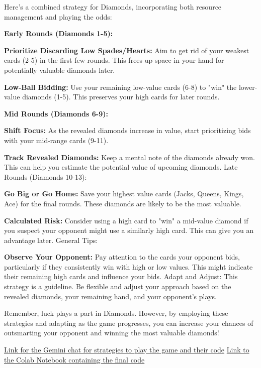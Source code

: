 \documentclass[runningheads]{llncs}
\begin{document}
\begin{thebibliography}{8}
Here's a combined strategy for Diamonds, incorporating both resource management and playing the odds:

\textbf{Early Rounds (Diamonds 1-5):}

\textbf{Prioritize Discarding Low Spades/Hearts:} Aim to get rid of your weakest cards (2-5) in the first few rounds. This frees up space in your hand for potentially valuable diamonds later.

\textbf{Low-Ball Bidding: }Use your remaining low-value cards (6-8) to "win" the lower-value diamonds (1-5). This preserves your high cards for later rounds.

\textbf{Mid Rounds (Diamonds 6-9):}

\textbf{Shift Focus: }As the revealed diamonds increase in value, start prioritizing bids with your mid-range cards (9-11).

\textbf{Track Revealed Diamonds:} Keep a mental note of the diamonds already won. This can help you estimate the potential value of upcoming diamonds.
Late Rounds (Diamonds 10-13):

\textbf{Go Big or Go Home: }Save your highest value cards (Jacks, Queens, Kings, Ace) for the final rounds. These diamonds are likely to be the most valuable.

\textbf{Calculated Risk: }Consider using a high card to "win" a mid-value diamond if you suspect your opponent might use a similarly high card. This can give you an advantage later.
General Tips:

\textbf{Observe Your Opponent:} Pay attention to the cards your opponent bids, particularly if they consistently win with high or low values. This might indicate their remaining high cards and influence your bids.
Adapt and Adjust: This strategy is a guideline. Be flexible and adjust your approach based on the revealed diamonds, your remaining hand, and your opponent's plays.

Remember, luck plays a part in Diamonds. However, by employing these strategies and adapting as the game progresses, you can increase your chances of outsmarting your opponent and winning the most valuable diamonds!

 \hyperlink{https://g.co/gemini/share/a8158544ac4e}{Link for the Gemini chat for strategies to play the game and their code}
\hyperlink{https://colab.research.google.com/drive/1p7STrJ8kBAuQ75E07eEHfYwvUyl0YKSX?usp=sharing}{Link to the Colab Notebook containing the final code}
\end{thebibliography}
\end{document}
